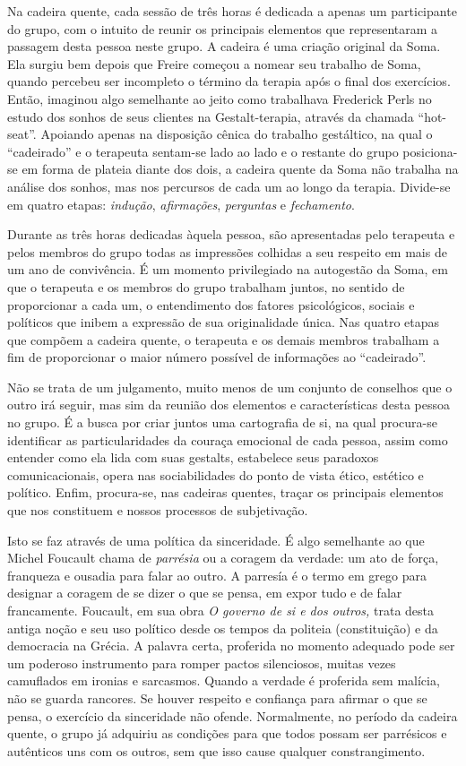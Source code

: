 Na cadeira quente, cada sessão de três horas é dedicada a apenas um
participante do grupo, com o intuito de reunir os principais elementos
que representaram a passagem desta pessoa neste grupo. A cadeira é uma
criação original da Soma. Ela surgiu bem depois que Freire começou a
nomear seu trabalho de Soma, quando percebeu ser incompleto o término da
terapia após o final dos exercícios. Então, imaginou algo semelhante ao
jeito como trabalhava Frederick Perls no estudo dos sonhos de seus
clientes na Gestalt-terapia, através da chamada ``hot-seat''. Apoiando
apenas na disposição cênica do trabalho gestáltico, na qual o
``cadeirado'' e o terapeuta sentam-se lado ao lado e o restante do grupo
posiciona-se em forma de plateia diante dos dois, a cadeira quente da
Soma não trabalha na análise dos sonhos, mas nos percursos de cada um ao
longo da terapia. Divide-se em quatro etapas: \emph{indução},
\emph{afirmações}, \emph{perguntas} e \emph{fechamento}.

Durante as três horas dedicadas àquela pessoa, são apresentadas pelo
terapeuta e pelos membros do grupo todas as impressões colhidas a seu
respeito em mais de um ano de convivência. É um momento privilegiado na
autogestão da Soma, em que o terapeuta e os membros do grupo trabalham
juntos, no sentido de proporcionar a cada um, o entendimento dos fatores
psicológicos, sociais e políticos que inibem a expressão de sua
originalidade única. Nas quatro etapas que compõem a cadeira quente, o
terapeuta e os demais membros trabalham a fim de proporcionar o maior
número possível de informações ao ``cadeirado''.

Não se trata de um julgamento, muito menos de um conjunto de conselhos
que o outro irá seguir, mas sim da reunião dos elementos e
características desta pessoa no grupo. É a busca por criar juntos uma
cartografia de si, na qual procura-se identificar as particularidades da
couraça emocional de cada pessoa, assim como entender como ela lida com
suas gestalts, estabelece seus paradoxos comunicacionais, opera nas
sociabilidades do ponto de vista ético, estético e político. Enfim,
procura-se, nas cadeiras quentes, traçar os principais elementos que nos
constituem e nossos processos de subjetivação.

Isto se faz através de uma política da sinceridade. É algo semelhante ao
que Michel Foucault chama de \emph{parrésia} ou a coragem da verdade: um
ato de força, franqueza e ousadia para falar ao outro. A parresía é o
termo em grego para designar a coragem de se dizer o que se pensa, em
expor tudo e de falar francamente. Foucault, em sua obra \emph{O governo
de si e dos outros,} trata desta antiga noção e seu uso político desde
os tempos da politeia (constituição) e da democracia na Grécia. A
palavra certa, proferida no momento adequado pode ser um poderoso
instrumento para romper pactos silenciosos, muitas vezes camuflados em
ironias e sarcasmos. Quando a verdade é proferida sem malícia, não se
guarda rancores. Se houver respeito e confiança para afirmar o que se
pensa, o exercício da sinceridade não ofende. Normalmente, no período da
cadeira quente, o grupo já adquiriu as condições para que todos possam
ser parrésicos e autênticos uns com os outros, sem que isso cause
qualquer constrangimento.

